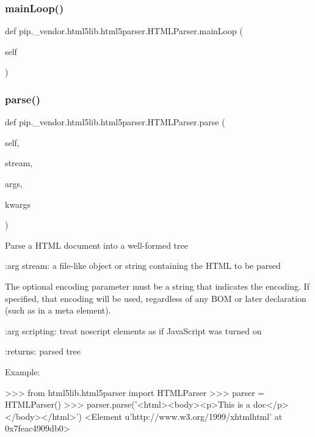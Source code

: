 \subsubsection{\texorpdfstring{main\+Loop()}{mainLoop()}}
{\footnotesize\ttfamily def pip.\+\_\+vendor.\+html5lib.\+html5parser.\+H\+T\+M\+L\+Parser.\+main\+Loop (\begin{DoxyParamCaption}\item[{}]{self }\end{DoxyParamCaption})}

\mbox{\label{classpip_1_1__vendor_1_1html5lib_1_1html5parser_1_1HTMLParser_ae92f6d5acf6f4e6f562d69b53c935e86}} 
\subsubsection{\texorpdfstring{parse()}{parse()}}
{\footnotesize\ttfamily def pip.\+\_\+vendor.\+html5lib.\+html5parser.\+H\+T\+M\+L\+Parser.\+parse (\begin{DoxyParamCaption}\item[{}]{self,  }\item[{}]{stream,  }\item[{}]{args,  }\item[{}]{kwargs }\end{DoxyParamCaption})}

\begin{DoxyVerb}Parse a HTML document into a well-formed tree

:arg stream: a file-like object or string containing the HTML to be parsed

    The optional encoding parameter must be a string that indicates
    the encoding.  If specified, that encoding will be used,
    regardless of any BOM or later declaration (such as in a meta
    element).

:arg scripting: treat noscript elements as if JavaScript was turned on

:returns: parsed tree

Example:

>>> from html5lib.html5parser import HTMLParser
>>> parser = HTMLParser()
>>> parser.parse('<html><body><p>This is a doc</p></body></html>')
<Element u'{http://www.w3.org/1999/xhtml}html' at 0x7feac4909db0>\end{DoxyVerb}
 \mbox{\label{classpip_1_1__vendor_1_1html5lib_1_1html5parser_1_1HTMLParser_a9c5fbf983ca2c56198830912ab893a7e}} 
